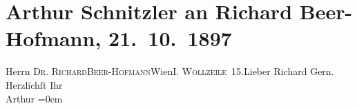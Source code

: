 

         
         \renewcommand{\erwaehntePersonen}{Personen: Richard Beer-Hofmann}
         \renewcommand{\erwaehnteOrte}{Orte: I., Innere Stadt, IX., Alsergrund, Wien, Wollzeile}
         \renewcommand{\erwaehnteWerke}{}
               \section[Arthur Schnitzler an Richard Beer-Hofmann, 21. 10. 1897]{ Arthur Schnitzler an Richard Beer-Hofmann, 21. 10. 1897}\nopagebreak{}\rehead{ }\begin{ledgroupsized}[t]{13cm}\normalsize\beginnumbering \toendnotes[C]{\smallbreak\pagebreak[2]} 
\pstart{}{\pb}Herrn \textsc{Dr. Richard}\pend{}\pstart{}\textsc{Beer-Hofmann}\pend{}\pstart{}Wien\pend{}\pstart{}\textsc{I. Wollzeile 15}.\pend{}{\bigskip}\pstart{}{\pb}Lieber Richard\pend\pstart
           Gern.\pend
           \pstart
           Herzlichſt Ihr{\\[\baselineskip]}\spacefill\mbox{Arthur}\pend
           \leftskip=0em{}
         
         \endnumbering{}\end{ledgroupsized}  \newcommand{\dateiname}{L00733}\newcommand{\titel}{Arthur Schnitzler an Richard Beer-Hofmann, 21. 10. 1897}\newcommand{\editorInnen}{Martin Anton Müller und Gerd-Hermann Susen}
      